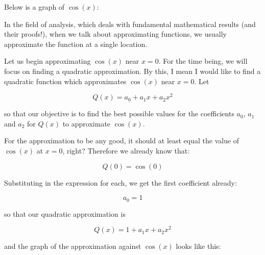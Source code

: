 \documentclass{article}
\begin{document}
Below is a graph of $\cos(x)$:

\begin{center}
\end{center}

In the field of analysis, which deals with fundamental mathematical results (and their proofs!), when we talk about approximating functions, we usually approximate the function at a single location.

Let us begin approximating $\cos(x)$ near $x=0$. For the time being, we will focus on finding a quadratic approximation. By this, I mean I would like to find a quadratic function which approximates $\cos(x)$ near $x=0$. Let

$$ Q(x) = a_0 + a_1 x + a_2 x^2 $$

so that our objective is to find the best possible values for the coefficients $a_0$, $a_1$ and $a_2$ for $Q(x)$ to approximate $\cos(x)$.

For the approximation to be any good, it should at least equal the value of $\cos(x)$ at $x=0$, right? Therefore we already know that:

$$ Q(0) = \cos(0) $$

Substituting in the expression for each, we get the first coefficient already:

$$ a_0 = 1 $$

so that our quadratic approximation is

$$ Q(x) = 1 + a_1 x + a_2 x^2 $$

and the graph of the approximation against $\cos(x)$ looks like this:

\begin{center}
\end{center}
\end{document}
